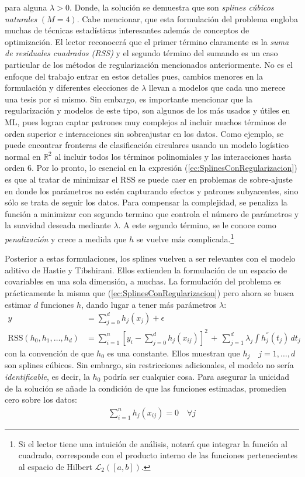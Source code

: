 \documentclass[../Main/Main.tex]{subfiles}
\begin{document}
para alguna $\lambda > 0$. Donde, la solución se demuestra que son \textit{splines cúbicos naturales} $(M = 4)$. Cabe mencionar, que esta formulación del problema engloba muchas de técnicas estadísticas interesantes además de conceptos de optimización. El lector reconocerá que el primer término claramente es la \textit{suma de residuales cuadrados (RSS)} y el segundo término del sumando es un caso particular de los métodos de regularización mencionados anteriormente. No es el enfoque del trabajo entrar en estos detalles pues, cambios menores en la formulación y diferentes elecciones de $\lambda$ llevan a modelos que cada uno merece una tesis por si mismo. Sin embargo, es importante mencionar que la regularización y modelos de este tipo, son algunos de los más usados y útiles en ML, pues logran captar patrones muy complejos al incluir muchos términos de orden superior e interacciones sin sobreajustar en los datos. Como ejemplo, se puede encontrar fronteras de clasificación circulares usando un modelo logístico normal en $\mathbb{R}^2$ al incluir todos los términos polinomiales y las interacciones hasta orden 6. Por lo pronto, lo esencial en la expresión (\ref{ec:SplinesConRegularizacion}) es que al tratar de minimizar el RSS se puede caer en problemas de sobre-ajuste en donde los parámetros no estén capturando efectos y patrones subyacentes, sino sólo se trata de seguir los datos. Para compensar la complejidad, se penaliza la función a minimizar con segundo termino que controla el número de parámetros y la suavidad deseada mediante $\lambda$. A este segundo término, se le conoce como \textit{penalización} y crece a medida que $h$ se vuelve más complicada.\footnote{Si el lector tiene una intuición de análisis, notará que integrar la función al cuadrado, corresponde con el producto interno de las funciones pertenecientes al espacio de Hilbert $\mathcal{L}_2([a,b])$.}

Posterior a estas formulaciones, los splines vuelven a ser relevantes con el modelo aditivo de Hastie y Tibshirani. Ellos extienden la formulación de un espacio de covariables en una sola dimensión, a muchas. La formulación del problema es prácticamente la misma que  (\ref{ec:SplinesConRegularizacion}) pero ahora se busca estimar $d$ funciones $h$, dando lugar a tener más parámetros $\lambda$:
\begin{align*}
	y &= \sum_{j = 0}^d h_j(x_j) + \epsilon \\	
	\text{RSS}(h_0, h_1, \ldots, h_d) &= \sum_{i = 1}^n[y_i - \sum_{j = 0}^d h_j(x_{ij})]^2 \, + \, \sum_{j = 1}^d\lambda_j 			\int h_j^{''}(t_j) \, dt_j
\end{align*}
con la convención de que $h_0$ es una constante. Ellos muestran que $h_j \quad j = 1,\ldots,d$ son splines cúbicos. Sin embargo, sin restricciones adicionales, el modelo no sería \textit{identificable}, es decir, la $h_0$ podría ser cualquier cosa. Para asegurar la unicidad de la solución se añade la condición de que las funciones estimadas, promedien cero sobre los datos:
\begin{align}
	\sum_{i = 1}^n h_j(x_{ij}) = 0 \quad \forall j \label{ec:RestriccionGAM}
\end{align}
\end{document}
